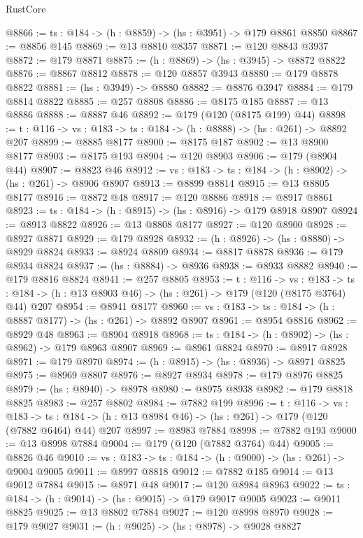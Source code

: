 \begin{lexlean}{RustCore}
\begin{coremodule}
@8866 := {ts : @184} -> (h : @8859) -> (hs : @3951) -> @179 @8861 @8850
@8867 := @8856 @145
@8869 := @13 @8810 @8357
@8871 := @120 @8843 @3937
@8872 := @179 @8871
@8875 := (h : @8869) -> (hs : @3945) -> @8872 @8822
@8876 := @8867 @8812
@8878 := @120 @8857 @3943
@8880 := @179 @8878 @8822
@8881 := (hs : @3949) -> @8880
@8882 := @8876 @3947
@8884 := @179 @8814 @8822
@8885 := @257 @8808
@8886 := @8175 @185
@8887 := @13 @8886
@8888 := @8887 @46
@8892 := @179 (@120 (@8175 @199) @44)
@8898 := {t : @116} -> {vs : @183} -> {ts : @184} -> (h : @8888) -> (hs : @261) -> @8892 @207
@8899 := @8885 @8177
@8900 := @8175 @187
@8902 := @13 @8900 @8177
@8903 := @8175 @193
@8904 := @120 @8903
@8906 := @179 (@8904 @44)
@8907 := @8823 @46
@8912 := {vs : @183} -> {ts : @184} -> (h : @8902) -> (hs : @261) -> @8906 @8907
@8913 := @8899 @8814
@8915 := @13 @8805 @8177
@8916 := @8872 @48
@8917 := @120 @8886
@8918 := @8917 @8861
@8923 := {ts : @184} -> (h : @8915) -> (hs : @8916) -> @179 @8918 @8907
@8924 := @8913 @8822
@8926 := @13 @8808 @8177
@8927 := @120 @8900
@8928 := @8927 @8871
@8929 := @179 @8928
@8932 := (h : @8926) -> (hs : @8880) -> @8929 @8824
@8933 := @8924 @8809
@8934 := @8817 @8878
@8936 := @179 @8934 @8824
@8937 := (hs : @8884) -> @8936
@8938 := @8933 @8882
@8940 := @179 @8816 @8824
@8941 := @257 @8805
@8953 := {t : @116} ->
  {vs : @183} ->
  {ts : @184} -> (h : @13 @8903 @46) -> (hs : @261) -> @179 (@120 (@8175 @3764) @44) @207
@8954 := @8941 @8177
@8960 := {vs : @183} -> {ts : @184} -> (h : @8887 @8177) -> (hs : @261) -> @8892 @8907
@8961 := @8954 @8816
@8962 := @8929 @48
@8963 := @8904 @8918
@8968 := {ts : @184} -> (h : @8902) -> (hs : @8962) -> @179 @8963 @8907
@8969 := @8961 @8824
@8970 := @8917 @8928
@8971 := @179 @8970
@8974 := (h : @8915) -> (hs : @8936) -> @8971 @8825
@8975 := @8969 @8807
@8976 := @8927 @8934
@8978 := @179 @8976 @8825
@8979 := (hs : @8940) -> @8978
@8980 := @8975 @8938
@8982 := @179 @8818 @8825
@8983 := @257 @8802
@8984 := @7882 @199
@8996 := {t : @116} ->
  {vs : @183} ->
  {ts : @184} -> (h : @13 @8984 @46) -> (hs : @261) -> @179 (@120 (@7882 @6464) @44) @207
@8997 := @8983 @7884
@8998 := @7882 @193
@9000 := @13 @8998 @7884
@9004 := @179 (@120 (@7882 @3764) @44)
@9005 := @8826 @46
@9010 := {vs : @183} -> {ts : @184} -> (h : @9000) -> (hs : @261) -> @9004 @9005
@9011 := @8997 @8818
@9012 := @7882 @185
@9014 := @13 @9012 @7884
@9015 := @8971 @48
@9017 := @120 @8984 @8963
@9022 := {ts : @184} -> (h : @9014) -> (hs : @9015) -> @179 @9017 @9005
@9023 := @9011 @8825
@9025 := @13 @8802 @7884
@9027 := @120 @8998 @8970
@9028 := @179 @9027
@9031 := (h : @9025) -> (hs : @8978) -> @9028 @8827

\end{coremodule}
\end{lexlean}
